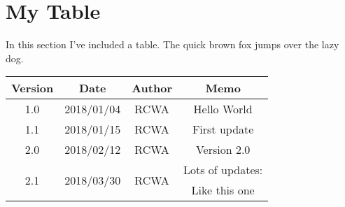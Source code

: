 \documentclass[12pt,letterpaper]{report}
\begin{document}
\section{My Table}
In this section I've included a table. The quick brown fox jumps over the lazy dog.
\begin{center}
\begin{tabular}{ |c|c|c|c| } 
\hline
Version & Date & Author & Memo \\
\hline
1.0 & 2018/01/04 & RCWA & Hello World \\
\hline
1.1 & 2018/01/15 & RCWA & First update\\
\hline
2.0 & 2018/02/12 & RCWA & Version 2.0 \\ 
\hline
\multirow{2}{*}{2.1} & \multirow{2}{*}{2018/03/30} & \multirow{2}{*}{RCWA} & Lots of updates:\\ 
 & & & Like this one \\
\hline
\end{tabular}
\end{center}

\centering
\end{document}
